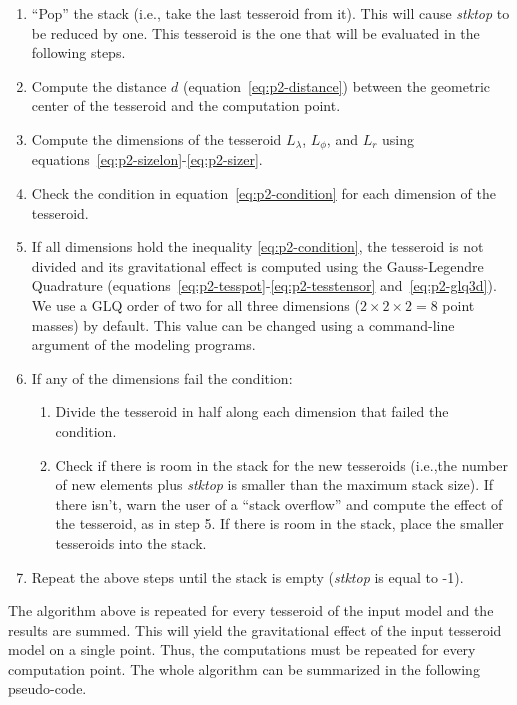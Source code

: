 \begin{enumerate}
    \item ``Pop'' the stack (i.e., take the last tesseroid from it).
        This will cause \emph{stktop} to be reduced by one.
        This tesseroid is the one that will be evaluated in the following
        steps.
    \item Compute the distance $d$ (equation~\ref{eq:p2-distance}) between
        the geometric center of the tesseroid and
        the computation point.
    \item Compute the dimensions of the tesseroid $L_\lambda$, $L_\phi$,
        and $L_r$ using equations~\ref{eq:p2-sizelon}-\ref{eq:p2-sizer}.
    \item Check the condition in equation~\ref{eq:p2-condition} for each
        dimension of the tesseroid.
    \item If all dimensions hold the inequality \ref{eq:p2-condition},
        the tesseroid is not divided and its
        gravitational effect is computed using the
        Gauss-Legendre Quadrature
        (equations~\ref{eq:p2-tesspot}-\ref{eq:p2-tesstensor} and~\ref{eq:p2-glq3d}).
        We use a GLQ order of two for all three dimensions
        ($2 \times 2 \times 2 = 8$ point masses)
        by default.
        This value can be changed using
        a command-line argument of the modeling programs.
    \item If any of the dimensions fail the condition:
    \begin{enumerate}
        \item Divide the tesseroid in half along each dimension that failed
             the condition.
        \item Check if there is room in the stack
            for the new tesseroids
            (i.e.,the number of new elements plus \emph{stktop}
             is smaller than the maximum stack size).
             If there isn't,
             warn the user of a ``stack overflow''
             and compute the effect of the tesseroid, as in step 5.
             If there is room in the stack,
             place the smaller tesseroids into
             the stack.
    \end{enumerate}
    \item Repeat the above steps until the stack is empty
        (\emph{stktop} is equal to -1).
\end{enumerate}

The algorithm above is repeated
for every tesseroid of the input model
and the results are summed.
This will yield the gravitational effect
of the input tesseroid model on a single point.
Thus, the computations must be repeated
for every computation point.
The whole algorithm can be summarized
in the following pseudo-code.

